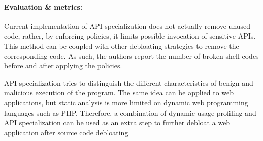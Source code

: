 \paragraph{Evaluation \& metrics:} Current implementation of API specialization does not actually remove unused code, rather, by enforcing policies, it limits possible invocation of sensitive APIs. This method can be coupled with other debloating strategies to remove the corresponding code. As such, the authors report the number of broken shell codes before and after applying the policies.

API specialization tries to distinguish the different characteristics of benign and malicious execution of the program. The same idea can be applied to web applications, but static analysis is more limited on dynamic web programming languages such as PHP. Therefore, a combination of dynamic usage profiling and API specialization can be used as an extra step to further debloat a web application after source code debloating.
